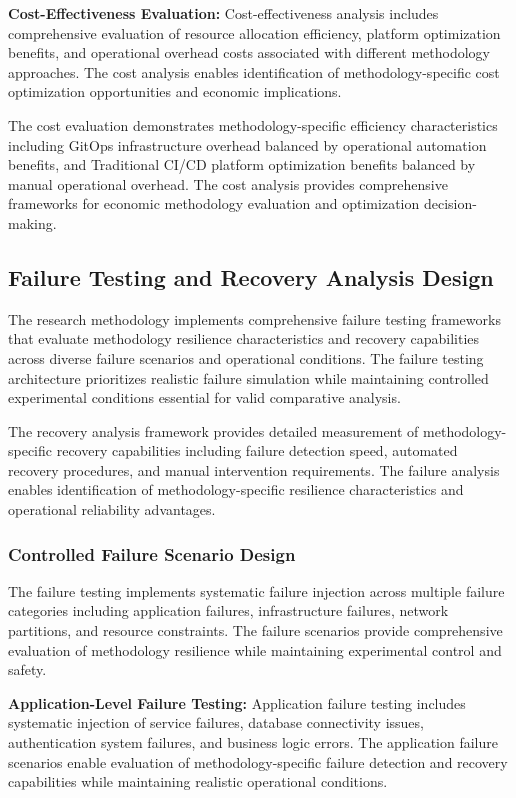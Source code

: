 \textbf{Cost-Effectiveness Evaluation:}
Cost-effectiveness analysis includes comprehensive evaluation of resource allocation efficiency, platform optimization benefits, and operational overhead costs associated with different methodology approaches. The cost analysis enables identification of methodology-specific cost optimization opportunities and economic implications.

The cost evaluation demonstrates methodology-specific efficiency characteristics including GitOps infrastructure overhead balanced by operational automation benefits, and Traditional CI/CD platform optimization benefits balanced by manual operational overhead. The cost analysis provides comprehensive frameworks for economic methodology evaluation and optimization decision-making.

\subsection{Failure Testing and Recovery Analysis Design}

The research methodology implements comprehensive failure testing frameworks that evaluate methodology resilience characteristics and recovery capabilities across diverse failure scenarios and operational conditions. The failure testing architecture prioritizes realistic failure simulation while maintaining controlled experimental conditions essential for valid comparative analysis.

The recovery analysis framework provides detailed measurement of methodology-specific recovery capabilities including failure detection speed, automated recovery procedures, and manual intervention requirements. The failure analysis enables identification of methodology-specific resilience characteristics and operational reliability advantages.

\subsubsection{Controlled Failure Scenario Design}

The failure testing implements systematic failure injection across multiple failure categories including application failures, infrastructure failures, network partitions, and resource constraints. The failure scenarios provide comprehensive evaluation of methodology resilience while maintaining experimental control and safety.

\textbf{Application-Level Failure Testing:}
Application failure testing includes systematic injection of service failures, database connectivity issues, authentication system failures, and business logic errors. The application failure scenarios enable evaluation of methodology-specific failure detection and recovery capabilities while maintaining realistic operational conditions.

